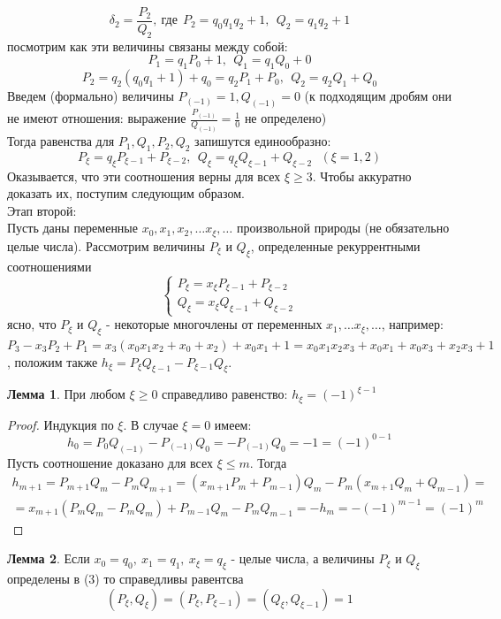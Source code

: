 \documentclass[a4paper, 12pt]{article}
\theoremstyle{definition}
\newtheorem{lemma}{Лемма}[section]
\begin{document}
    \[\delta_2=\frac{P_2}{Q_2},\ \text{где}\ \ P_2=q_0 q_1 q_2+1,\ \ Q_2=q_1 q_2+1\]
    посмотрим как эти величины связаны между собой:
    \[P_1=q_1 P_0+1,\ \ Q_1=q_1 Q_0+0\]
    \[P_2=q_2 (q_0q_1+1)+q_0=q_2 P_1+P_0,\ \ Q_2=q_2 Q_1+Q_0\]
    Введем (формально) величины $P_{(-1)}=1, Q_{(-1)}=0$ (к подходящим дробям они не имеют отношения: выражение $\frac{P_{(-1)}}{Q_{(-1)}}=\frac{1}{0}$ не определено)\\
    Тогда равенства для $P_1, Q_1, P_2, Q_2$ запишутся единообразно:
    \[P_{\xi}=q_{\xi}P_{\xi-1}+P_{\xi-2},\ \ Q_{\xi}=q_{\xi}Q_{\xi-1}+Q_{\xi-2}\ \ \ (\xi=1,2)\]
    Оказывается, что эти соотношения верны для всех $\xi\geq 3$. Чтобы аккуратно доказать их, поступим следующим образом.
    \\Этап второй:\\
    Пусть даны переменные $x_0, x_1, x_2,\dots x_{\xi}, \dots$ произвольной природы (не обязательно целые числа). Рассмотрим величины $P_{\xi}$ и $Q_{\xi}$, определенные рекуррентными соотношениями
    \begin{equation} \label{equation3}
        \begin{cases}
            P_{\xi}=x_{\xi} P_{\xi-1}+P_{\xi-2}\\
            Q_{\xi}=x_{\xi} Q_{\xi-1}+Q_{\xi-2}
        \end{cases}
    \end{equation}
    ясно, что $P_{\xi}$ и $Q_{\xi}$ - некоторые многочлены от переменных $x_1,\dots x_{\xi},\dots$, например: $P_3-x_3P_2+P_1=x_3(x_0x_1x_2+x_0+x_2)+x_0x_1+1=x_0x_1x_2x_3+x_0x_1+x_0x_3+x_2x_3+1$, положим также $h_{\xi}=P_{\xi}Q_{\xi-1}-P_{\xi-1}Q_{\xi}$.
    \begin{lemma}\label{lemma7.1}
        При любом $\xi\geq 0$ справедливо равенство: $h_{\xi}=(-1)^{\xi-1}$
    \end{lemma} 
    \begin{proof}
        Индукция по $\xi$. В случае $\xi=0$ имеем: \[h_0=P_0Q_{(-1)}-P_{(-1)}Q_0=-P_{(-1)}Q_0=-1=(-1)^{0-1}\]
        Пусть соотношение доказано для всех $\xi\leq m$. Тогда 
        \begin{multline*}
            h_{m+1}=P_{m+1}Q_m-P_m Q_{m+1}=(x_{m+1}P_m+P_{m-1})Q_m-P_m(x_{m+1}Q_m+Q_{m-1})=\\=x_{m+1}(P_m Q_m-P_m Q_m)+P_{m-1}Q_m-P_m Q_{m-1}=-h_m=-(-1)^{m-1}=(-1)^m
        \end{multline*}
    \end{proof} 
    \begin{lemma}\label{lemma7.2}
        Если $x_0=q_0,\ x_1=q_1,\ x_{\xi}=q_{\xi}$ - целые числа, а величины $P_{\xi}$ и $Q_{\xi}$ определены в (3) то справедливы равентсва \[(P_{\xi},Q_{\xi})=(P_{\xi},P_{\xi-1})=(Q_{\xi},Q_{\xi-1})=1\]
    \end{lemma} 
\end{document}
